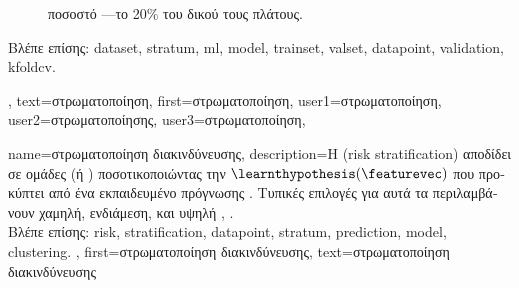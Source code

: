 {{\begin{figure}[H]
{{{			ποσοστό} —\foreignlanguage{greek}{το 20\% του δικού τους πλάτους}. \label{fig_stratification_dict}} }
 		\end{figure}
  		\foreignlanguage{greek}{Βλέπε επίσης:} \gls{dataset}, \gls{stratum}, \gls{ml}, \gls{model}, \gls{trainset}, \gls{valset}, \gls{datapoint}, 
		\gls{validation}, \gls{kfoldcv}. },
  	text={\foreignlanguage{greek}{στρωματοποίηση}},
  	first={\foreignlanguage{greek}{στρωματοποίηση}},
	user1={\foreignlanguage{greek}{στρωματοποίηση}}, %
	user2={\foreignlanguage{greek}{στρωματοποίησης}}, %
	user3={\foreignlanguage{greek}{στρωματοποίηση}}, %
}

{name={\foreignlanguage{greek}{στρωματοποίηση διακινδύνευσης}},
	description={\foreignlanguage{greek}{Η}  
		\linebreak (risk stratification) \foreignlanguage{greek}{αποδίδει}  \foreignlanguage{greek}{σε ομάδες} 
		 \foreignlanguage{greek}{(ή} ) \foreignlanguage{greek}{ποσοτικοποιώντας την}  
		$\learnthypothesis(\featurevec)$ \foreignlanguage{greek}{που προκύπτει από ένα εκπαιδευμένο}  
		\foreignlanguage{greek}{πρόγνωσης} . \foreignlanguage{greek}{Τυπικές επιλογές για αυτά τα}  
		\foreignlanguage{greek}{περιλαμβάνουν χαμηλή, ενδιάμεση, και υψηλή}  \cite{Collins:2012aa}, \cite{Steyerberg2019}. 
		\\
		\foreignlanguage{greek}{Βλέπε επίσης:} \gls{risk}, \gls{stratification}, \gls{datapoint}, \gls{stratum}, \gls{prediction}, \gls{model}, \gls{clustering}. },
	first={\foreignlanguage{greek}{στρωματοποίηση διακινδύνευσης}},
	text={\foreignlanguage{greek}{στρωματοποίηση διακινδύνευσης}}
}

